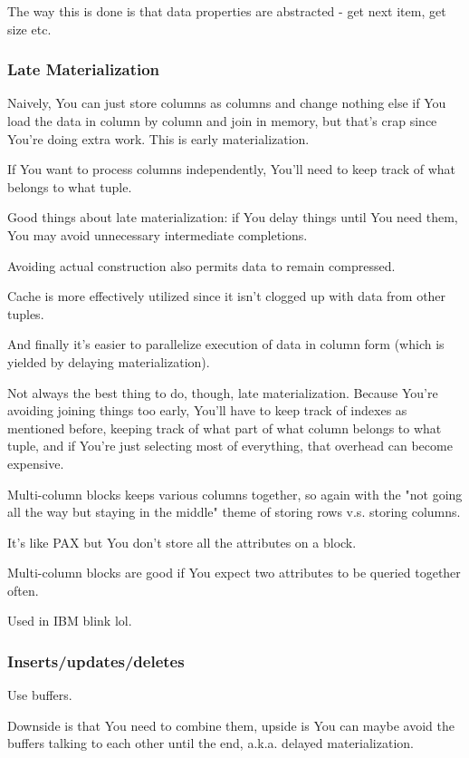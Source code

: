 \documentclass{article}
\begin{document}
			The way this is done is that data properties are abstracted - get next item, get size etc.
			
		\subsubsection{Late Materialization}
		
			Naively, You can just store columns as columns and change nothing else if You load the data in column by column and join in memory, but that's crap since You're doing extra work. This is early materialization.
			
			If You want to process columns independently, You'll need to keep track of what belongs to what tuple.
			
			Good things about late materialization: if You delay things until You need them, You may avoid unnecessary intermediate completions. 
			
			Avoiding actual construction also permits data to remain compressed.
			
			Cache is more effectively utilized since it isn't clogged up with data from other tuples.
			
			And finally it's easier to parallelize execution of data in column form (which is yielded by delaying materialization).
			
			Not always the best thing to do, though, late materialization. Because You're avoiding joining things too early, You'll have to keep track of indexes as mentioned before, keeping track of what part of what column belongs to what tuple, and if You're just selecting most of everything, that overhead can become expensive.
			
			Multi-column blocks keeps various columns together, so again with the "not going all the way but staying in the middle" theme of storing rows v.s. storing columns.
			
			It's like PAX but You don't store all the attributes on a block.
			
			Multi-column blocks are good if You expect two attributes to be queried together often.
			
			Used in IBM blink lol.
			
		\subsubsection{Inserts/updates/deletes}
		
			Use buffers.
			
			Downside is that You need to combine them, upside is You can maybe avoid the buffers talking to each other until the end, a.k.a. delayed materialization.
			
\end{document}
